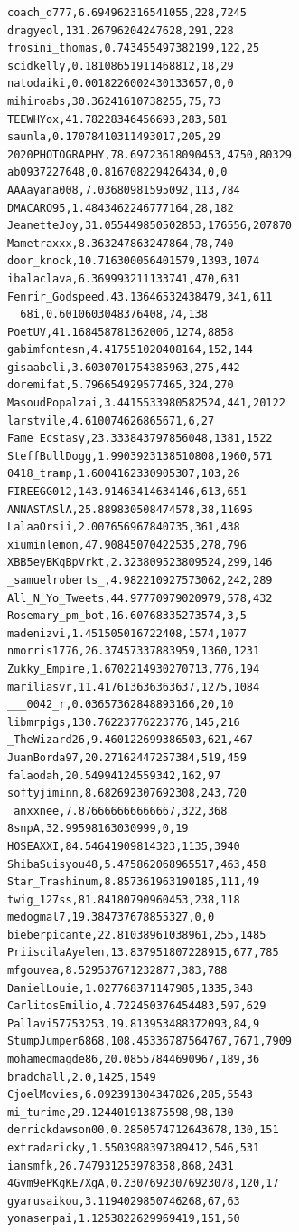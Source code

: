 \begin{verbatim}
coach_d777,6.694962316541055,228,7245
dragyeol,131.26796204247628,291,228
frosini_thomas,0.743455497382199,122,25
scidkelly,0.18108651911468812,18,29
natodaiki,0.0018226002430133657,0,0
mihiroabs,30.36241610738255,75,73
TEEWHYox,41.78228346456693,283,581
saunla,0.17078410311493017,205,29
2020PHOTOGRAPHY,78.69723618090453,4750,80329
ab0937227648,0.816708229426434,0,0
AAAayana008,7.03680981595092,113,784
DMACARO95,1.4843462246777164,28,182
JeanetteJoy,31.055449850502853,176556,207870
Mametraxxx,8.363247863247864,78,740
door_knock,10.716300056401579,1393,1074
ibalaclava,6.369993211133741,470,631
Fenrir_Godspeed,43.13646532438479,341,611
__68i,0.6010603048376408,74,138
PoetUV,41.168458781362006,1274,8858
gabimfontesn,4.417551020408164,152,144
gisaabeli,3.6030701754385963,275,442
doremifat,5.796654929577465,324,270
MasoudPopalzai,3.4415533980582524,441,20122
larstvile,4.610074626865671,6,27
Fame_Ecstasy,23.333843797856048,1381,1522
SteffBullDogg,1.9903923138510808,1960,571
0418_tramp,1.6004162330905307,103,26
FIREEGG012,143.91463414634146,613,651
ANNASTASlA,25.889830508474578,38,11695
LalaaOrsii,2.007656967840735,361,438
xiuminlemon,47.90845070422535,278,796
XBB5eyBKqBpVrkt,2.323809523809524,299,146
_samuelroberts_,4.982210927573062,242,289
All_N_Yo_Tweets,44.97770979020979,578,432
Rosemary_pm_bot,16.60768335273574,3,5
madenizvi,1.451505016722408,1574,1077
nmorris1776,26.37457337883959,1360,1231
Zukky_Empire,1.6702214930270713,776,194
mariliasvr,11.417613636363637,1275,1084
___0042_r,0.03657362848893166,20,10
libmrpigs,130.76223776223776,145,216
_TheWizard26,9.460122699386503,621,467
JuanBorda97,20.27162447257384,519,459
falaodah,20.54994124559342,162,97
softyjiminn,8.682692307692308,243,720
_anxxnee,7.876666666666667,322,368
8snpA,32.99598163030999,0,19
HOSEAXXI,84.54641909814323,1135,3940
ShibaSuisyou48,5.475862068965517,463,458
Star_Trashinum,8.857361963190185,111,49
twig_127ss,81.84180790960453,238,118
medogmal7,19.384737678855327,0,0
bieberpicante,22.81038961038961,255,1485
PriiscilaAyelen,13.837951807228915,677,785
mfgouvea,8.529537671232877,383,788
DanielLouie,1.027768371147985,1335,348
CarlitosEmilio,4.722450376454483,597,629
Pallavi57753253,19.813953488372093,84,9
StumpJumper6868,108.45336787564767,7671,7909
mohamedmagde86,20.08557844690967,189,36
bradchall,2.0,1425,1549
CjoelMovies,6.092391304347826,285,5543
mi_turime,29.124401913875598,98,130
derrickdawson00,0.2850574712643678,130,151
extradaricky,1.5503988397389412,546,531
iansmfk,26.747931253978358,868,2431
4Gvm9ePKgKE7XgA,0.23076923076923078,120,17
gyarusaikou,3.1194029850746268,67,63
yonasenpai,1.1253822629969419,151,50

\end{verbatim}
